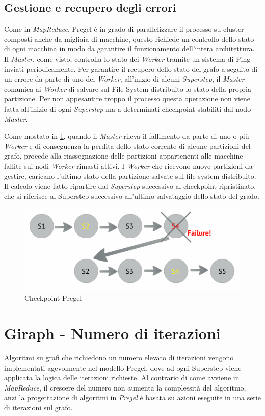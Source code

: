 \documentclass[LaM,binding=0.6cm]{sapthesis}
\begin{document}
\subsection{Gestione e recupero degli errori}
Come in \textit{MapReduce}, Pregel è in grado di parallelizzare il processo su cluster composti anche da migliaia di macchine, questo richiede un controllo dello stato di ogni macchina in modo da garantire il funzionamento dell'intera architettura. Il \textit{Master}, come visto, controlla lo stato dei \textit{Worker} tramite un sistema di Ping inviati periodicamente.
Per garantire il recupero dello stato del grafo a seguito di un errore da parte di uno dei \textit{Worker}, all'inizio di alcuni \textit{Superstep}, il \textit{Master }comunica ai \textit{Worker} di salvare sul File System distribuito lo stato della propria partizione. Per non appesantire troppo il processo questa operazione non viene fatta all'inizio di ogni \textit{Superstep} ma a determinati checkpoint stabiliti dal nodo \textit{Master}.

Come mostato in \ref{fig:recovPregele}, quando il \textit{Master} rileva il fallimento da parte di uno o più \textit{Worker} e di conseguenza la perdita dello stato corrente di alcune partizioni del grafo, procede alla riassegnazione delle partizioni appartenenti alle macchine fallite sui nodi \textit{Worker} rimasti attivi.
I \textit{Worker} che ricevono nuove partizioni da gestire, caricano l'ultimo stato della partizione salvate sul file system distribuito.
Il calcolo viene fatto ripartire dal \textit{Superstep} successivo al checkpoint ripristinato, che si riferisce al Superstep successivo all'ultimo salvataggio dello stato del grado.


\begin{figure}
\centering
\includegraphics[width=1\textwidth]{giraph-tollerance}
\caption{Checkpoint Pregel}
\label{fig:recovPregele}
\end{figure}

\section{Giraph - Numero di iterazioni}
Algoritmi su grafi che richiedono un numero elevato di iterazioni vengono implementati agevolmente nel modello Pregel, dove ad ogni Superstep viene applicata la logica delle iterazioni richieste.
Al contrario di come avviene in \textit{MapReduce}, il crescere del numero non aumenta la complessità del algoritmo, anzi la progettazione di algoritmi in \textit{Pregel} è basata su azioni eseguite in una serie di iterazioni sul grafo.
\end{document}

